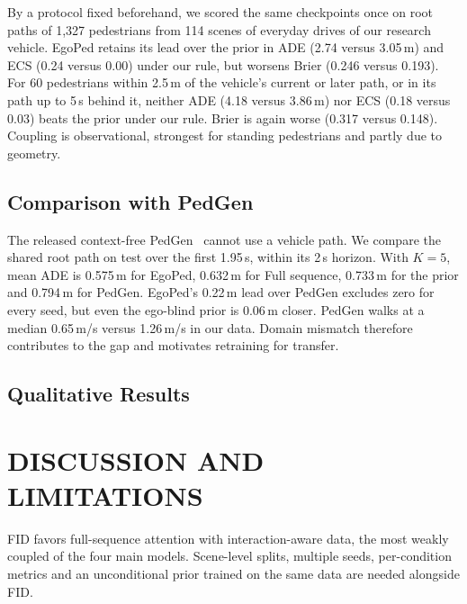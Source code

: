 \documentclass[letterpaper, 10 pt, conference]{ieeeconf}
\newcommand{\method}{EgoPed\xspace}
\newcommand{\fullseq}{Full sequence\xspace}
\begin{document}
By a protocol fixed beforehand, we scored the same checkpoints once on root paths of 1{,}327 pedestrians from 114 scenes of everyday drives of our research vehicle. \method retains its lead over the prior in ADE (2.74 versus 3.05\,m) and ECS (0.24 versus 0.00) under our rule, but worsens Brier (0.246 versus 0.193). For 60 pedestrians within 2.5\,m of the vehicle's current or later path, or in its path up to 5\,s behind it, neither ADE (4.18 versus 3.86\,m) nor ECS (0.18 versus 0.03) beats the prior under our rule. Brier is again worse (0.317 versus 0.148). Coupling is observational, strongest for standing pedestrians and partly due to geometry.



\subsection{Comparison with PedGen}
\label{sec:pedgen}

The released context-free PedGen~\cite{liu2025pedgen} cannot use a vehicle path. We compare the shared root path on test over the first 1.95\,s, within its 2\,s horizon. With $K{=}5$, mean ADE is 0.575\,m for \method, 0.632\,m for \fullseq, 0.733\,m for the prior and 0.794\,m for PedGen. \method's 0.22\,m lead over PedGen excludes zero for every seed, but even the ego-blind prior is 0.06\,m closer. PedGen walks at a median 0.65\,m/s versus 1.26\,m/s in our data. Domain mismatch therefore contributes to the gap and motivates retraining for transfer.



\subsection{Qualitative Results}


\section{DISCUSSION AND LIMITATIONS}
\label{sec:discussion}
\label{sec:limitations}

FID favors full-sequence attention with interaction-aware data, the most weakly coupled of the four main models. Scene-level splits, multiple seeds, per-condition metrics and an unconditional prior trained on the same data are needed alongside FID.
\end{document}
